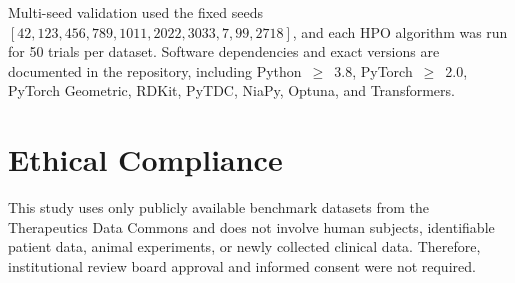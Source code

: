 \documentclass[journal]{IEEEtran}
\begin{document}
Multi-seed validation used the fixed seeds $[42, 123, 456, 789, 1011, 2022, 3033, 7, 99, 2718]$, and each HPO algorithm was run for 50 trials per dataset. Software dependencies and exact versions are documented in the repository, including Python~$\geq$~3.8, PyTorch~$\geq$~2.0, PyTorch Geometric, RDKit, PyTDC, NiaPy, Optuna, and Transformers.

\section*{Ethical Compliance}
This study uses only publicly available benchmark datasets from the Therapeutics Data Commons and does not involve human subjects, identifiable patient data, animal experiments, or newly collected clinical data. Therefore, institutional review board approval and informed consent were not required.



\end{document}
